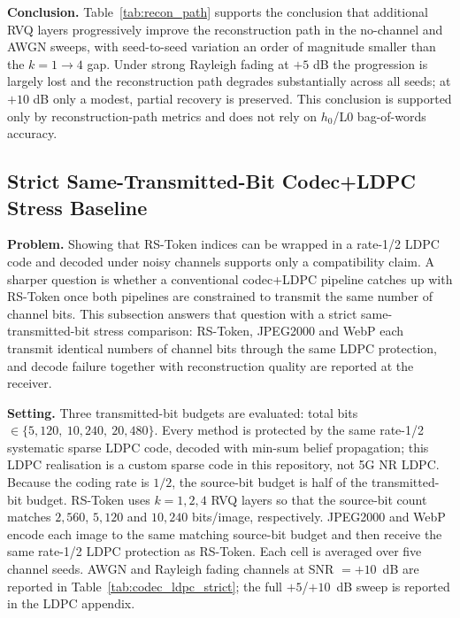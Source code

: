 \documentclass[lettersize,journal]{IEEEtran}
\begin{document}
\textbf{Conclusion.} Table~\ref{tab:recon_path} supports the conclusion that additional RVQ layers progressively improve the reconstruction path in the no-channel and AWGN sweeps, with seed-to-seed variation an order of magnitude smaller than the $k=1\to4$ gap. Under strong Rayleigh fading at $+5$ dB the progression is largely lost and the reconstruction path degrades substantially across all seeds; at $+10$ dB only a modest, partial recovery is preserved. This conclusion is supported only by reconstruction-path metrics and does not rely on $h_0$/L0 bag-of-words accuracy.

\subsection{Strict Same-Transmitted-Bit Codec+LDPC Stress Baseline}
\textbf{Problem.} Showing that RS-Token indices can be wrapped in a rate-1/2 LDPC code and decoded under noisy channels supports only a compatibility claim. A sharper question is whether a conventional codec+LDPC pipeline catches up with RS-Token once both pipelines are constrained to transmit the same number of channel bits. This subsection answers that question with a strict same-transmitted-bit stress comparison: RS-Token, JPEG2000 and WebP each transmit identical numbers of channel bits through the same LDPC protection, and decode failure together with reconstruction quality are reported at the receiver.

\textbf{Setting.} Three transmitted-bit budgets are evaluated: total bits $\in \{5{,}120,\ 10{,}240,\ 20{,}480\}$. Every method is protected by the same rate-1/2 systematic sparse LDPC code, decoded with min-sum belief propagation; this LDPC realisation is a custom sparse code in this repository, not 5G NR LDPC. Because the coding rate is $1/2$, the source-bit budget is half of the transmitted-bit budget. RS-Token uses $k=1,2,4$ RVQ layers so that the source-bit count matches $2{,}560$, $5{,}120$ and $10{,}240$ bits/image, respectively. JPEG2000 and WebP encode each image to the same matching source-bit budget and then receive the same rate-1/2 LDPC protection as RS-Token. Each cell is averaged over five channel seeds. AWGN and Rayleigh fading channels at SNR $=+10$~dB are reported in Table~\ref{tab:codec_ldpc_strict}; the full $+5$/$+10$~dB sweep is reported in the LDPC appendix.
\end{document}
